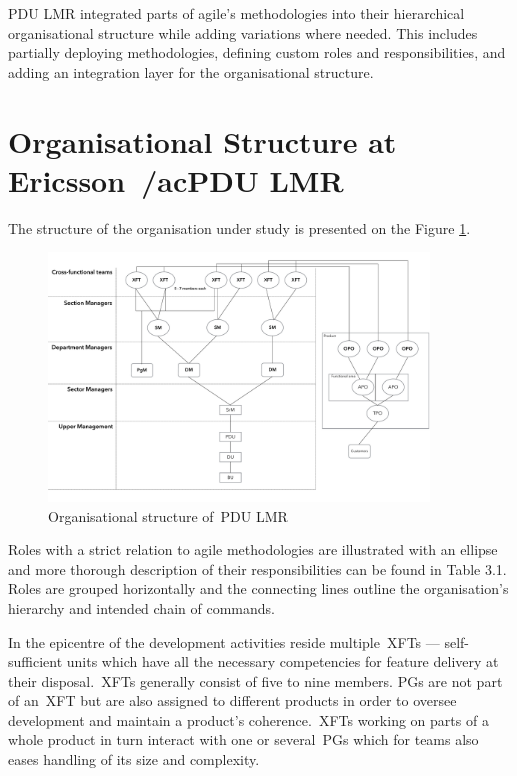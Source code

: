 \ac{PDU LMR} integrated parts of agile's methodologies into their hierarchical organisational structure while adding variations where needed. This includes partially deploying methodologies, defining custom roles and responsibilities, and adding an integration layer for the organisational structure.

\section{Organisational Structure at Ericsson~/ac{PDU LMR}}
\label{Chap:OrgStrucEricsson}

The structure of the organisation under study is presented on the Figure \ref{fig:org-structure}.

\begin{figure}[h!]
  \centering
  \includegraphics[width=0.90\textwidth]{figures/organisational-structure.pdf}
  \caption{Organisational structure of~\ac{PDU LMR}}
  \label{fig:org-structure}
\end{figure}

Roles with a strict relation to agile methodologies are illustrated with an ellipse and more thorough description of their responsibilities can be found in Table 3.1. Roles are grouped horizontally and the connecting lines outline the organisation's hierarchy and intended chain of commands.

In the epicentre of the development activities reside multiple~\acp{XFT} — self-sufficient units which have all the necessary competencies for feature delivery at their disposal.~\acp{XFT} generally consist of five to nine members. 
\acp{PG} are not part of an~\ac{XFT} but are also assigned to different products in order to oversee development and maintain a product's coherence.~\acp{XFT} working on parts of a whole product in turn interact with one or several~\acp{PG} which for teams also eases handling of its size and complexity.

